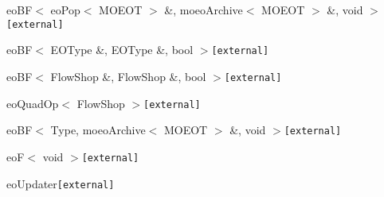 \begin{CompactList}
\begin{CompactList}
\begin{CompactList}
\item {}
\end{CompactList}
\item eo\-BF$<$ eo\-Pop$<$ MOEOT $>$ \&, moeo\-Archive$<$ MOEOT $>$ \&, void $>${\tt  [external]}\begin{CompactList}
\item {}
\begin{CompactList}
\item {}
\item {}
\end{CompactList}
\end{CompactList}
\item eo\-BF$<$ EOType \&, EOType \&, bool $>${\tt  [external]}\item eo\-BF$<$ Flow\-Shop \&, Flow\-Shop \&, bool $>${\tt  [external]}\begin{CompactList}
\item eo\-Quad\-Op$<$ Flow\-Shop $>${\tt  [external]}\begin{CompactList}
\item {}
\end{CompactList}
\end{CompactList}
\item eo\-BF$<$ Type, moeo\-Archive$<$ MOEOT $>$ \&, void $>${\tt  [external]}\begin{CompactList}
\item {}
\begin{CompactList}
\item {}
\end{CompactList}
\end{CompactList}
\item eo\-F$<$ void $>${\tt  [external]}\begin{CompactList}
\item eo\-Updater{\tt  [external]}\begin{CompactList}

\end{CompactList}
\end{CompactList}
\end{CompactList}
\end{CompactList}
